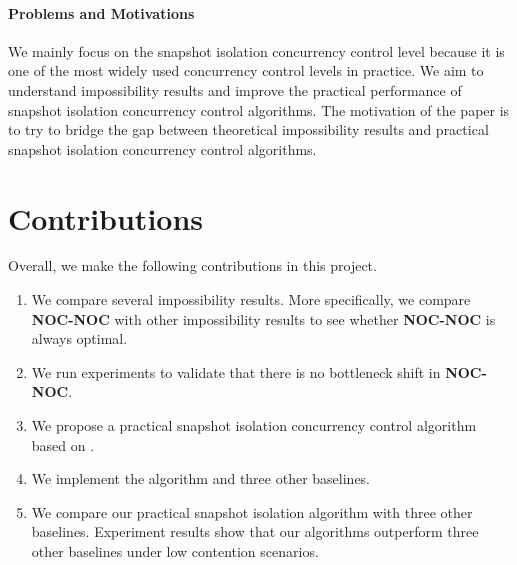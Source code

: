 \paragraph{Problems and Motivations}
We mainly focus on the snapshot isolation concurrency control level because it is one of the most widely used concurrency control levels in practice. We aim to understand impossibility results and improve the practical performance of snapshot isolation concurrency control algorithms. The motivation of the paper is to try to bridge the gap between theoretical impossibility results and practical snapshot isolation concurrency control algorithms.


\section{Contributions}
Overall, we make the following contributions in this project.

\begin{enumerate}
    \item We compare several impossibility results. More specifically, we compare \textbf{NOC-NOC} with other impossibility results to see whether \textbf{NOC-NOC} is always optimal.
    \item We run experiments to validate that there is no bottleneck shift in \textbf{NOC-NOC}.
    \item We propose a practical snapshot isolation concurrency control algorithm based on \cite{lu2023ncc}.
    \item We implement the algorithm and three other baselines.
    \item We compare our practical snapshot isolation algorithm with three other baselines. Experiment results show that our algorithms outperform three other baselines under low contention scenarios.
\end{enumerate}





